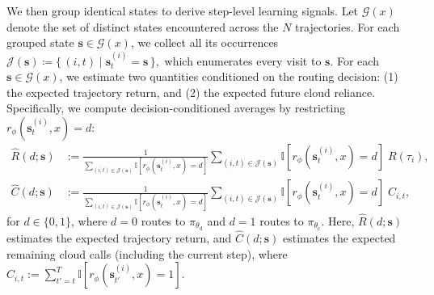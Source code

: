 \documentclass{article}
\begin{document}
We then group identical states to derive step-level learning signals.
Let $\mathcal{G}(x)$ denote the set of distinct states encountered across the $N$ trajectories.
For each grouped state $\mathbf{s}\in\mathcal{G}(x)$, we collect all its occurrences
$
\mathcal{J}(\mathbf{s}) \coloneqq \{\, (i,t) \mid \mathbf{s}^{(i)}_t=\mathbf{s} \,\},
$
which enumerates every visit to $\mathbf{s}$.
For each $\mathbf{s}\in\mathcal{G}(x)$, we estimate two quantities conditioned on the routing decision:
(1) the expected trajectory return, and
(2) the expected future cloud reliance.
Specifically, we compute decision-conditioned averages by restricting $r_{\phi} ({\mathbf{s}}_{t}^{(i)},x)=d$:
\begin{align}
\widehat{R}(d;\mathbf{s})
&:= \frac{1}{\sum_{(i,t)\in\mathcal{J}(\mathbf{s})}\mathbb{I}[r_{\phi} ({\mathbf{s}}_{t}^{(i)},x)=d]}
\sum_{(i,t)\in\mathcal{J}(\mathbf{s})}\mathbb{I}[r_{\phi} ({\mathbf{s}}_{t}^{(i)},x)=d]\; R(\tau_i), \label{eq:group_return2}\\
\widehat{C}(d;\mathbf{s})
&:= \frac{1}{\sum_{(i,t)\in\mathcal{J}(\mathbf{s})}\mathbb{I}[r_{\phi} ({\mathbf{s}}_{t}^{(i)},x)=d]}
\sum_{(i,t)\in\mathcal{J}(\mathbf{s})}\mathbb{I}[r_{\phi} ({\mathbf{s}}_{t}^{(i)},x)=d]\; C_{i,t}, \label{eq:group_cloud2}
\end{align}
for $d\in\{0,1\}$, where $d=0$ routes to $\pi_{\theta_\mathrm{d}}$ and $d=1$ routes to $\pi_{\theta_\mathrm{c}}$.
Here, $\widehat{R}(d;\mathbf{s})$ estimates the expected trajectory return, and $\widehat{C}(d;\mathbf{s})$ estimates the expected remaining cloud calls (including the current step), where
$C_{i,t} := \sum_{t' = t}^{T} \mathbb{I}\!\left[r_{\phi} ({\mathbf{s}}_{t'}^{(i)},x) = 1\right]$.
\end{document}
